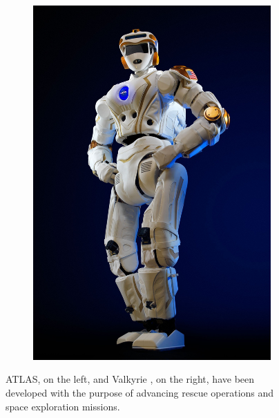 \begin{figure}
\begin{subfigure}[b]{0.4\textwidth}
    \includegraphics[width=\textwidth]{figures/NASA-Valkyrie.jpeg}
    \caption{}
    \label{fig:valkyrie}
  \end{subfigure}
  \caption{ATLAS, on the left, and Valkyrie \cite{Radford2015Valkyrie}, on the 
      right, have been developed with the purpose of advancing rescue operations
      and space exploration missions.}
\end{figure}

